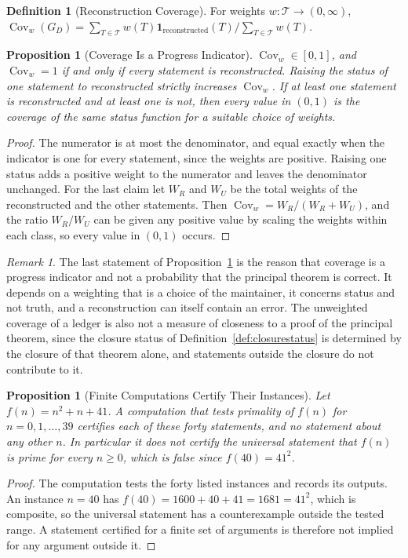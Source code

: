 \documentclass[11pt,letterpaper]{report}
\theoremstyle{plain}
\newtheorem{proposition}[theorem]{Proposition}
\theoremstyle{definition}
\newtheorem{definition}[theorem]{Definition}
\theoremstyle{remark}
\newtheorem{remark}[theorem]{Remark}
\begin{document}
\begin{definition}[Reconstruction Coverage]\label{def:coverage}
For weights $w:\mathcal T\to(0,\infty)$, $\operatorname{Cov}_w(G_D)=\sum_{T\in\mathcal T}w(T)\mathbf 1_{\mathrm{reconstructed}}(T)\Big/\sum_{T\in\mathcal T}w(T)$.
\end{definition}

\begin{proposition}[Coverage Is a Progress Indicator]\label{pr:coverage}
$\operatorname{Cov}_w\in[0,1]$, and $\operatorname{Cov}_w=1$ if and only if every statement is reconstructed. Raising the status of one statement to reconstructed strictly increases $\operatorname{Cov}_w$. If at least one statement is reconstructed and at least one is not, then every value in $(0,1)$ is the coverage of the same status function for a suitable choice of weights.
\end{proposition}
\begin{proof}
The numerator is at most the denominator, and equal exactly when the indicator is one for every statement, since the weights are positive. Raising one status adds a positive weight to the numerator and leaves the denominator unchanged. For the last claim let $W_R$ and $W_U$ be the total weights of the reconstructed and the other statements. Then $\operatorname{Cov}_w=W_R/(W_R+W_U)$, and the ratio $W_R/W_U$ can be given any positive value by scaling the weights within each class, so every value in $(0,1)$ occurs.
\end{proof}

\begin{remark}
The last statement of Proposition~\ref{pr:coverage} is the reason that coverage is a progress indicator and not a probability that the principal theorem is correct. It depends on a weighting that is a choice of the maintainer, it concerns status and not truth, and a reconstruction can itself contain an error. The unweighted coverage of a ledger is also not a measure of closeness to a proof of the principal theorem, since the closure status of Definition~\ref{def:closurestatus} is determined by the closure of that theorem alone, and statements outside the closure do not contribute to it.
\end{remark}

\begin{proposition}[Finite Computations Certify Their Instances]\label{pr:finitecomp}
Let $f(n)=n^2+n+41$. A computation that tests primality of $f(n)$ for $n=0,1,\dots,39$ certifies each of these forty statements, and no statement about any other $n$. In particular it does not certify the universal statement that $f(n)$ is prime for every $n\ge0$, which is false since $f(40)=41^2$.
\end{proposition}
\begin{proof}
The computation tests the forty listed instances and records its outputs. An instance $n=40$ has $f(40)=1600+40+41=1681=41^2$, which is composite, so the universal statement has a counterexample outside the tested range. A statement certified for a finite set of arguments is therefore not implied for any argument outside it.
\end{proof}
\end{document}

